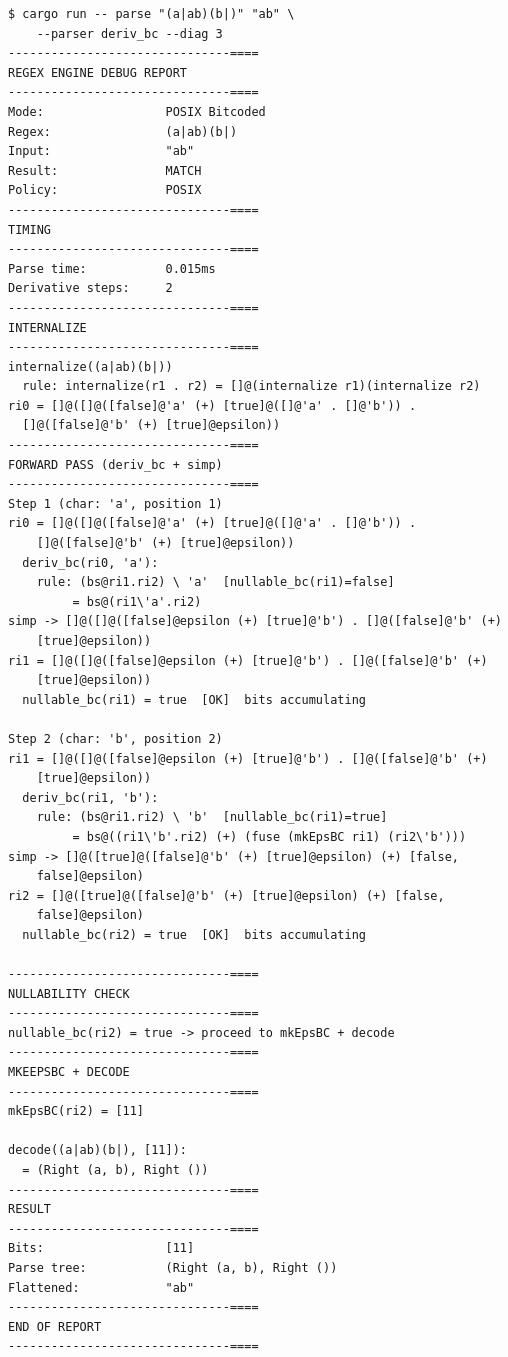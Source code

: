 \begin{verbatim}
$ cargo run -- parse "(a|ab)(b|)" "ab" \
    --parser deriv_bc --diag 3
-------------------------------====
REGEX ENGINE DEBUG REPORT
-------------------------------====
Mode:                 POSIX Bitcoded
Regex:                (a|ab)(b|)
Input:                "ab"
Result:               MATCH
Policy:               POSIX
-------------------------------====
TIMING
-------------------------------====
Parse time:           0.015ms
Derivative steps:     2
-------------------------------====
INTERNALIZE
-------------------------------====
internalize((a|ab)(b|))
  rule: internalize(r1 . r2) = []@(internalize r1)(internalize r2)
ri0 = []@([]@([false]@'a' (+) [true]@([]@'a' . []@'b')) .
  []@([false]@'b' (+) [true]@epsilon))
-------------------------------====
FORWARD PASS (deriv_bc + simp)
-------------------------------====
Step 1 (char: 'a', position 1)
ri0 = []@([]@([false]@'a' (+) [true]@([]@'a' . []@'b')) .
    []@([false]@'b' (+) [true]@epsilon))
  deriv_bc(ri0, 'a'):
    rule: (bs@ri1.ri2) \ 'a'  [nullable_bc(ri1)=false]
         = bs@(ri1\'a'.ri2)
simp -> []@([]@([false]@epsilon (+) [true]@'b') . []@([false]@'b' (+)
    [true]@epsilon))
ri1 = []@([]@([false]@epsilon (+) [true]@'b') . []@([false]@'b' (+)
    [true]@epsilon))
  nullable_bc(ri1) = true  [OK]  bits accumulating

Step 2 (char: 'b', position 2)
ri1 = []@([]@([false]@epsilon (+) [true]@'b') . []@([false]@'b' (+)
    [true]@epsilon))
  deriv_bc(ri1, 'b'):
    rule: (bs@ri1.ri2) \ 'b'  [nullable_bc(ri1)=true]
         = bs@((ri1\'b'.ri2) (+) (fuse (mkEpsBC ri1) (ri2\'b')))
simp -> []@([true]@([false]@'b' (+) [true]@epsilon) (+) [false,
    false]@epsilon)
ri2 = []@([true]@([false]@'b' (+) [true]@epsilon) (+) [false,
    false]@epsilon)
  nullable_bc(ri2) = true  [OK]  bits accumulating

-------------------------------====
NULLABILITY CHECK
-------------------------------====
nullable_bc(ri2) = true -> proceed to mkEpsBC + decode
-------------------------------====
MKEEPSBC + DECODE
-------------------------------====
mkEpsBC(ri2) = [11]

decode((a|ab)(b|), [11]):
  = (Right (a, b), Right ())
-------------------------------====
RESULT
-------------------------------====
Bits:                 [11]
Parse tree:           (Right (a, b), Right ())
Flattened:            "ab"
-------------------------------====
END OF REPORT
-------------------------------====
\end{verbatim}

